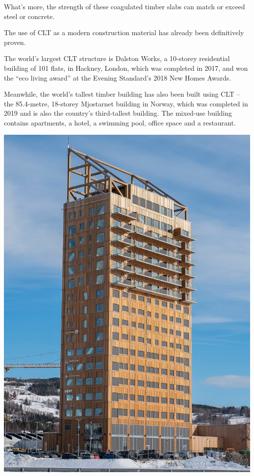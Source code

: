 \documentclass[
]{book}
\begin{document}
What's more, the strength of these coagulated timber slabs can match or exceed steel or concrete.

The use of CLT as a modern construction material has already been definitively proven.

The world's largest CLT structure is Dalston Works, a 10-storey residential building of 101 flats, in Hackney, London, which was completed in 2017, and won the ``eco living award'' at the Evening Standard's 2018 New Homes Awards.

Meanwhile, the world's tallest timber building has also been built using CLT -- the 85.4-metre, 18-storey Mjostarnet building in Norway, which was completed in 2019 and is also the country's third-tallest building. The mixed-use building contains apartments, a hotel, a swimming pool, office space and a restaurant.

\includegraphics{fig/mjostarnet.png}
\end{document}
